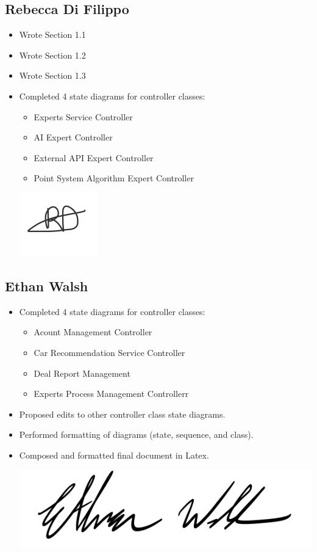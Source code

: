 \documentclass[]{article}
\begin{document}
\subsection{Rebecca Di Filippo}
\begin{itemize}
   \item Wrote Section 1.1
   \item Wrote Section 1.2
   \item Wrote Section 1.3
    \item Completed 4 state diagrams for controller classes:
        \begin{itemize}
          \item Experts Service Controller
          \item AI Expert Controller
          \item External API Expert Controller 
          \item Point System Algorithm Expert Controller
        \end{itemize}
        \begin{center}
          \includegraphics[scale=0.6]{rebecca.png}
        \end{center}
\end{itemize}

\subsection{Ethan Walsh}
\begin{itemize}
  \item Completed 4 state diagrams for controller classes:
        \begin{itemize}
          \item Acount Management Controller
          \item Car Recommendation Service Controller
          \item Deal Report Management
          \item Experts Process Management Controllerr
        \end{itemize}
  \item Proposed edits to other controller class state diagrams.
  \item Performed formatting of diagrams (state, sequence, and class).
  \item Composed and formatted final document in Latex.
  \begin{center}
          \includegraphics[scale=0.4]{ethan.png}
        \end{center}
\end{itemize}
\end{document}
